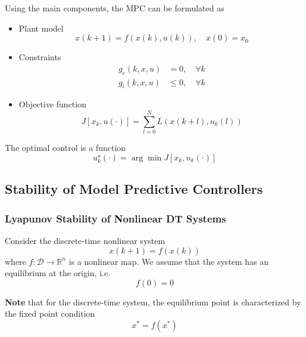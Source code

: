 Using the main components, the MPC can be formulated as
\begin{itemize}
    \item Plant model
          \begin{equation*}
              x(k + 1) = f(x(k), u(k)), \quad x(0) = x_0
          \end{equation*}

    \item Constraints
          \begin{align*}
              g_e(k, x, u) & = 0, \quad \forall k    \\
              g_i(k, x, u) & \leq 0, \quad \forall k
          \end{align*}

    \item Objective function
          \begin{equation*}
              J[x_k, u(\cdot)] = \sum_{l=0}^{N} L(x(k + l), u_k(l))
          \end{equation*}
\end{itemize}

The optimal control is a function
\begin{equation*}
    u_k^\star(\cdot) = \arg\min J[x_k, u_k(\cdot)]
\end{equation*}

\subsection{Stability of Model Predictive Controllers}
\subsubsection{Lyapunov Stability of Nonlinear DT Systems}

Consider the discrete-time nonlinear system
\begin{equation*}
    x(k + 1) = f(x(k))
\end{equation*}
where $f: \mathcal{D} \to \mathbb{R}^n$ is a nonlinear map. We assume that the system has an equilibrium at the origin, i.e.
\begin{equation*}
    f(0) = 0
\end{equation*}

\newpar{}
\textbf{Note} that for the discrete-time system, the equilibrium point is characterized by the fixed point condition
\begin{equation*}
    x^* = f(x^*)
\end{equation*}

